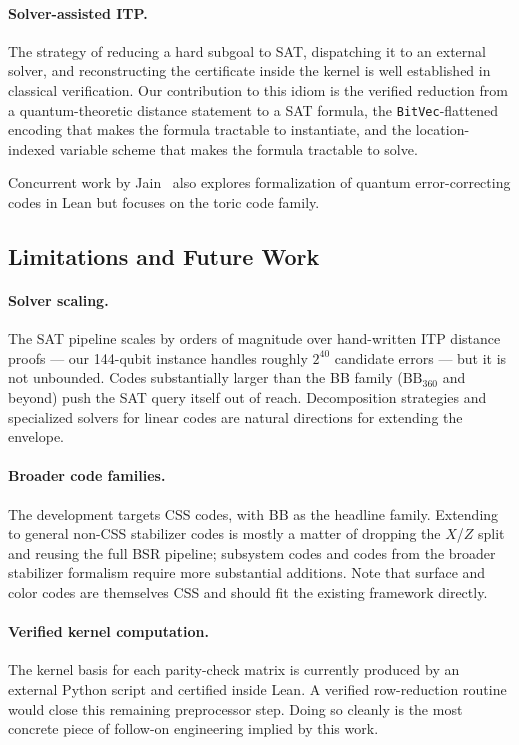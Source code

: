 \paragraph{Solver-assisted ITP.} The strategy of reducing a hard subgoal to SAT,
dispatching it to an external solver, and reconstructing the certificate inside
the kernel is well established in classical verification. Our contribution to
this idiom is the verified reduction from a quantum-theoretic distance statement
to a SAT formula, the \lstinline{BitVec}-flattened encoding that makes the
formula tractable to instantiate, and the location-indexed variable scheme that
makes the formula tractable to solve.

Concurrent work by Jain~\cite{qeclean} also explores formalization of quantum
error-correcting codes in Lean but focuses on the toric code family.

\subsection{Limitations and Future Work}\label{sec:future}

\paragraph{Solver scaling.}
The SAT pipeline scales by orders of magnitude over hand-written ITP distance
proofs --- our 144-qubit instance handles roughly $2^{40}$ candidate errors ---
but it is not unbounded. Codes substantially larger than the BB family
($\mathrm{BB}_{360}$ and beyond) push the SAT query itself out of reach.
Decomposition strategies and specialized solvers for
linear codes are natural directions for extending the envelope.

\paragraph{Broader code families.}
The development targets CSS codes, with BB as the headline family. Extending to
general non-CSS stabilizer codes is mostly a matter of dropping the $X$/$Z$
split and reusing the full BSR pipeline; subsystem codes and codes from the
broader stabilizer formalism require more substantial additions. Note that
surface and color codes are themselves CSS and should fit the existing framework
directly.

\paragraph{Verified kernel computation.}
The kernel basis for each parity-check matrix is currently produced by an
external Python script and certified inside Lean. A verified row-reduction
routine would close this remaining preprocessor step. Doing so cleanly is the
most concrete piece of follow-on engineering implied by this work.

